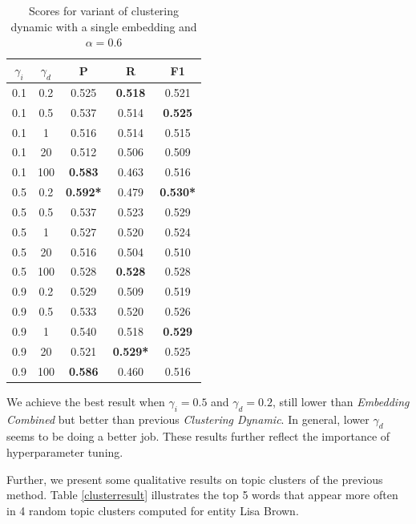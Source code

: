 \documentclass{article}
\begin{document}
\begin{table}[H]
\center
\begin{tabular}{|c|c|c|c|c|} \hline
$\gamma_i$ & $\gamma_d$ & \textbf{P} & \textbf{R} & \textbf{F1} \\ \hline\hline
0.1 & 0.2 & 0.525 & \textbf{0.518} & 0.521 \\ \hline
0.1 & 0.5 & 0.537 & 0.514 & \textbf{0.525} \\ \hline
0.1 & 1   & 0.516 & 0.514 & 0.515 \\ \hline
0.1 & 20  & 0.512 & 0.506 & 0.509 \\ \hline
0.1 & 100 & \textbf{0.583} & 0.463 & 0.516 \\ \hline\hline
0.5 & 0.2 & \textbf{0.592*} & 0.479 & \textbf{0.530*} \\ \hline
0.5 & 0.5 & 0.537 & 0.523 & 0.529 \\ \hline
0.5 & 1   & 0.527 & 0.520 & 0.524 \\ \hline
0.5 & 20  & 0.516 & 0.504 & 0.510 \\ \hline
0.5 & 100 & 0.528 & \textbf{0.528} & 0.528 \\ \hline\hline
0.9 & 0.2 & 0.529 & 0.509 & 0.519 \\ \hline
0.9 & 0.5 & 0.533 & 0.520 & 0.526 \\ \hline
0.9 & 1   & 0.540 & 0.518 & \textbf{0.529} \\ \hline
0.9 & 20  & 0.521 & \textbf{0.529*} & 0.525 \\ \hline
0.9 & 100 & \textbf{0.586} & 0.460 & 0.516 \\ \hline
\end{tabular}
\caption{Scores for variant of clustering dynamic with a single embedding and $\alpha=0.6$}
\label{varyinggamma}
\end{table}

We achieve the best result when $\gamma_i=0.5$ and $\gamma_d=0.2$, still lower than \textit{Embedding Combined} but better than previous {\textit{Clustering Dynamic}}. In general, lower $\gamma_d$ seems to be doing a better job. These results further reflect the importance of hyperparameter tuning.

Further, we present some qualitative results on topic clusters of the previous method. Table \ref{clusterresult} illustrates the top 5 words that appear more often in 4 random topic clusters computed for entity Lisa Brown.
\end{document}
